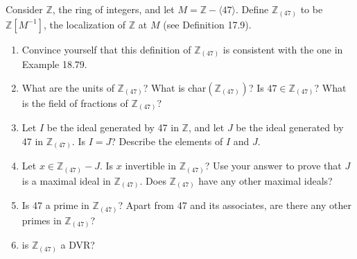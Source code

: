 \documentclass[12pt,letterpaper,boxed]{hmcpset}
\begin{document}
\begin{solution}
\end{solution}

\clearpage

\begin{problem}[18.6.4]
Consider $\mathbb{Z}$, the ring of integers, and let $M = \mathbb{Z} - \langle 47 \rangle$. Define $\mathbb{Z}_{(47)}$ to be $\mathbb{Z}[M^{-1}]$, the localization of $\mathbb{Z}$ at $M$ (see Definition 17.9).
\begin{enumerate}[label=\alph*]
\item Convince yourself that this definition of $\mathbb{Z}_{(47)}$ is consistent with the one in Example 18.79.
\item What are the units of $\mathbb{Z}_{(47)}$? What is char$(\mathbb{Z}_{(47)})$? Is $47 \in \mathbb{Z}_{(47)}$? What is the field of fractions of $\mathbb{Z}_{(47)}$?
\item Let $I$ be the ideal generated by 47 in $\mathbb{Z}$, and let $J$ be the ideal generated by 47 in $\mathbb{Z}_{(47)}$. Is $I=J$? Describe the elements of $I$ and $J$.
\item Let $x \in \mathbb{Z}_{(47)} - J$. Is $x$ invertible in $\mathbb{Z}_{(47)}$? Use your answer to prove that $J$ is a maximal ideal in $\mathbb{Z}_{(47)}$. Does $\mathbb{Z}_{(47)}$ have any other maximal ideals?
\item Is 47 a prime in $\mathbb{Z}_{(47)}$? Apart from 47 and its associates, are there any other primes in $\mathbb{Z}_{(47)}$?
\item is $\mathbb{Z}_{(47)}$ a DVR?
\end{enumerate}
\end{problem}

\begin{solution}
\end{solution}
\end{document}
